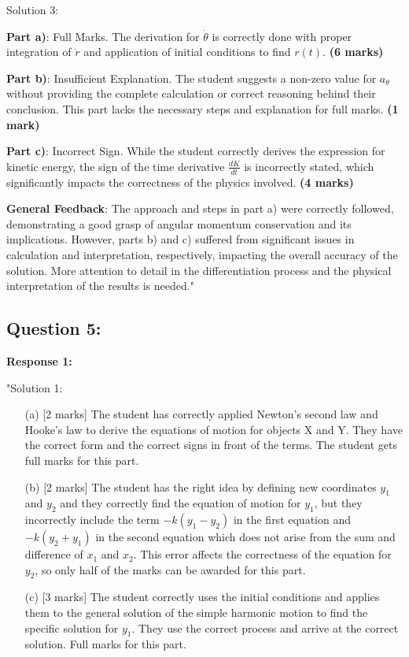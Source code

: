 \documentclass[a4paper,11pt]{article}
\begin{document}
Solution 3:

\textbf{Part a)}: Full Marks. The derivation for \(\dot{\theta}\) is correctly done with proper integration of \(\dot{r}\) and application of initial conditions to find \(r(t)\). \textbf{(6 marks)}

\textbf{Part b)}: Insufficient Explanation. The student suggests a non-zero value for \(a_{\theta}\) without providing the complete calculation or correct reasoning behind their conclusion. This part lacks the necessary steps and explanation for full marks. \textbf{(1 mark)}

\textbf{Part c)}: Incorrect Sign. While the student correctly derives the expression for kinetic energy, the sign of the time derivative \(\frac{dK}{dt}\) is incorrectly stated, which significantly impacts the correctness of the physics involved. \textbf{(4 marks)}

\textbf{General Feedback}: The approach and steps in part a) were correctly followed, demonstrating a good grasp of angular momentum conservation and its implications. However, parts b) and c) suffered from significant issues in calculation and interpretation, respectively, impacting the overall accuracy of the solution. More attention to detail in the differentiation process and the physical interpretation of the results is needed."

\subsection*{Question 5:}

\textbf{Response 1:}

"\noindent Solution 1:

\begin{itemize}
    \item[(a)] [2 marks] The student has correctly applied Newton’s second law and Hooke’s law to derive the equations of motion for objects X and Y. They have the correct form and the correct signs in front of the terms. The student gets full marks for this part.
    
    \item[(b)] [2 marks] The student has the right idea by defining new coordinates \( y_{1} \) and \( y_{2} \) and they correctly find the equation of motion for \( y_{1} \), but they incorrectly include the term \( -k(y_{1} - y_{2}) \) in the first equation and \( -k(y_{2} + y_{1}) \) in the second equation which does not arise from the sum and difference of \( x_{1} \) and \( x_{2} \). This error affects the correctness of the equation for \( y_{2} \), so only half of the marks can be awarded for this part.
    
    \item[(c)] [3 marks] The student correctly uses the initial conditions and applies them to the general solution of the simple harmonic motion to find the specific solution for \( y_{1} \). They use the correct process and arrive at the correct solution. Full marks for this part.
\end{itemize}
\end{document}
